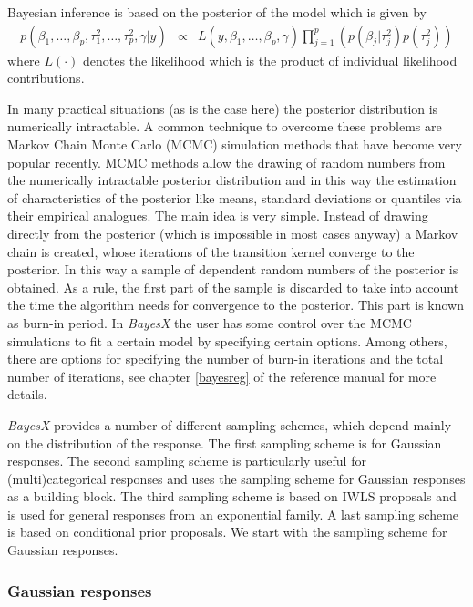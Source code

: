 \documentclass[11pt,a4paper,twoside]{bayesxarticle}
\begin{document}
Bayesian inference is based on the posterior of the model which is
given by
\begin{equation}
\label{posterior}
\begin{array}{lll}
 p(\beta_1,\dots,\beta_p,\tau^2_1,\dots,\tau^2_p,\gamma|y) & \propto & L(y,\beta_1,\dots,\beta_p, \gamma)
\displaystyle \prod_{j=1}^p \left( p(\beta_j|\tau_j^2) p(\tau^2_j)
\right)
 \end{array}
\end{equation}
where  $L(\cdot)$ denotes the likelihood which is the product of
individual likelihood contributions.


In many practical situations (as is the case here) the posterior
distribution is numerically intractable. A common technique to
overcome  these problems are Markov Chain Monte Carlo (MCMC)
simulation methods that have become very popular recently. MCMC
methods allow the drawing of random numbers from the numerically
intractable posterior distribution and in this way the estimation of
characteristics of the posterior like means, standard deviations or
quantiles via their empirical analogues. The main idea is very
simple. Instead of drawing directly from the posterior (which is
impossible in most cases anyway) a Markov chain is created, whose
iterations of the transition kernel converge to the posterior. In
this way a sample of dependent random numbers of the posterior is
obtained. As a rule, the first part of the sample is discarded to
take into account the time the algorithm needs for convergence to
the posterior. This part is known as burn-in period. In {\em BayesX}
the user has some control over the MCMC simulations to fit a certain
model by specifying certain options. Among others, there are options
for specifying the number of burn-in iterations and the total number
of iterations, see chapter \ref*{bayesreg} of the reference manual
for more details.

{\em BayesX} provides a number of different sampling schemes,
which depend mainly on the distribution of the response. The first
sampling scheme is for Gaussian responses. The second sampling
scheme is particularly useful for (multi)categorical responses
and uses the sampling scheme for Gaussian responses as a building
block. The third sampling scheme is based on IWLS proposals and is
used for general responses from an exponential family. A last
sampling scheme is based on conditional prior proposals. We start
with the sampling scheme for Gaussian responses.

\subsubsection{Gaussian responses}
\end{document}
